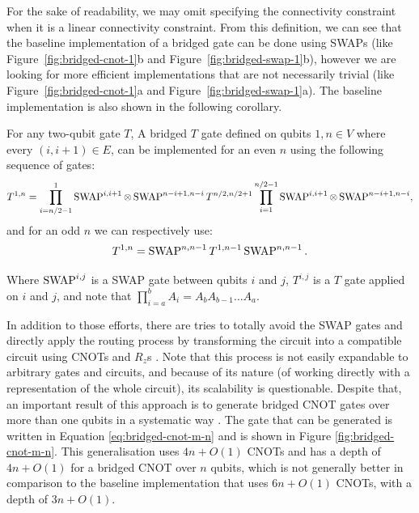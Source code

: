 For the sake of readability, we may omit specifying the connectivity constraint when it is a linear connectivity constraint. From this definition, we can see that the baseline implementation of a bridged gate can be done using SWAPs (like Figure~\ref{fig:bridged-cnot-1}b and Figure~\ref{fig:bridged-swap-1}b), however we are looking for more efficient implementations that are not necessarily trivial (like Figure~\ref{fig:bridged-cnot-1}a and Figure~\ref{fig:bridged-swap-1}a). The baseline implementation is also shown in the following corollary.

\begin{corollary}\label{cor:baseline-bridged}
  For any two-qubit gate $T$, A bridged $T$ gate defined on qubits $1, n \in V$ where every $(i, i + 1) \in E$, can be implemented for an even $n$ using the following sequence of gates:
  \begin{equation}
    T^{1,n} = \prod_{i=n/2-1}^{1} \operatorname{SWAP}^{i,i+1} \otimes \operatorname{SWAP}^{n-i+1, n-i} T^{n/2, n/2+1} \prod_{i=1}^{n/2-1} \operatorname{SWAP}^{i,i+1} \otimes \operatorname{SWAP}^{n-i+1, n-i},
  \end{equation}
  and for an odd $n$ we can respectively use:
  \begin{equation}
    T^{1,n} = \operatorname{SWAP}^{n,n-1} T^{1,n-1} \operatorname{SWAP}^{n,n-1}.
  \end{equation}

  Where $\operatorname{SWAP}^{i,j}$ is a SWAP gate between qubits $i$ and $j$, $T^{i,j}$ is a $T$ gate applied on $i$ and $j$, and note that $\prod_{i=a}^b A_i = A_b A_{b-1} \dots A_a$.
\end{corollary}

In addition to those efforts, there are tries to totally avoid the SWAP gates and directly apply the routing process by transforming the circuit into a compatible circuit using CNOTs and $R_z$s \cite{nash2020,kissinger2019}. Note that this process is not easily expandable to arbitrary gates and circuits, and because of its nature (of working directly with a representation of the whole circuit), its scalability is questionable. Despite that, an important result of this approach is to generate bridged CNOT gates over more than one qubits in a systematic way \cite{nash2020}. The gate that can be generated is written in Equation \ref{eq:bridged-cnot-m-n} and is shown in Figure \ref{fig:bridged-cnot-m-n}. This generalisation uses $4n + O(1)$ CNOTs and has a depth of $4n + O(1)$ for a bridged CNOT over $n$ qubits, which is not generally better in comparison to the baseline implementation that uses $6n + O(1)$ CNOTs, with a depth of $3n + O(1)$.

